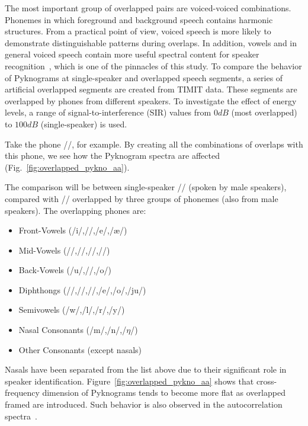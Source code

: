 {The most important group of overlapped pairs are voiced-voiced combinations. 
Phonemes in which foreground and background speech contains harmonic structures.
From a practical point of view, voiced speech is more likely to demonstrate distinguishable patterns during overlaps. 
In addition, vowels and in general voiced speech contain more useful spectral content for speaker recognition~\cite{early_speakerid_paper}, which is one of the pinnacles of this study. 
To compare the behavior of Pyknograms at single-speaker and overlapped speech segments, a series of artificial overlapped segments are created from TIMIT data. 
These segments are overlapped by phones from different speakers. 
To investigate the effect of energy levels, a range of signal-to-interference (SIR) values from $0dB$ (most overlapped) to $100dB$ (single-speaker) is used. 

Take the phone /\textscripta/, for example. By creating all the combinations of overlaps with this phone, we  see how the Pyknogram spectra are affected (Fig.~\ref{fig:overlapped_pykno_aa}).

The comparison will be between single-speaker /\textscripta/ (spoken by male speakers), compared with /\textscripta/ overlapped by three groups of phonemes (also from male speakers). 
The overlapping phones are: 
\begin{itemize}
	\item Front-Vowels (/i\textlengthmark/,/\textsci/,/e/,/\ae/)
	\item Mid-Vowels (/\textscripta/,/\textrhookrevepsilon/,/\textturnv/,/\textopeno/)
	\item Back-Vowels (/u/,/\textscu/,/o/)
	\item Diphthongs (/\textscripta\textsci/,/\textopeno\textsci/,/\textscripta\textscu/,/e\textsci/,/o\textscu/,/ju/)
	\item Semivowels (/w/,/l/,/r/,/y/)
	\item Nasal Consonants (/m/,/n/,/$\eta$/)
	\item Other Consonants (except nasals)
\end{itemize}

Nasals have been separated from the list above due to their significant role in speaker identification. Figure~\ref{fig:overlapped_pykno_aa} shows that cross-frequency dimension of Pyknograms tends to become more flat as overlapped framed are introduced. 
Such behavior is also observed in the autocorrelation spectra~\cite{sapvr_paper}. 

 
\newpage

}
